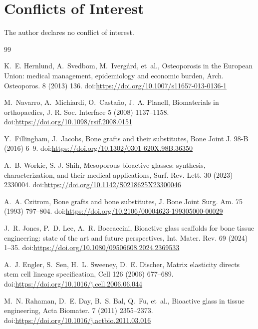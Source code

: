 \documentclass[11pt]{article}
\begin{document}
\section*{Conflicts of Interest}
The author declares no conflict of interest.
\newpage

\begin{thebibliography}{99}


K.~E. Hernlund, A.~Svedbom, M.~Iverg\aa{}rd, et~al., Osteoporosis in the European Union: medical management, epidemiology and economic burden, Arch. Osteoporos. 8 (2013) 136.
\newblock doi:\url{https://doi.org/10.1007/s11657-013-0136-1}


M.~Navarro, A.~Michiardi, O.~Casta\~no, J.~A. Planell, Biomaterials in orthopaedics, J. R. Soc. Interface 5 (2008) 1137--1158.
\newblock doi:\url{https://doi.org/10.1098/rsif.2008.0151}


Y.~Fillingham, J.~Jacobs, Bone grafts and their substitutes, Bone Joint J. 98-B (2016) 6--9.
\newblock doi:\url{https://doi.org/10.1302/0301-620X.98B.36350}

A.~B. Workie, S.-J. Shih, Mesoporous bioactive glasses: synthesis, characterization, and their medical applications, Surf. Rev. Lett. 30 (2023) 2330004.
\newblock doi:\url{https://doi.org/10.1142/S0218625X23300046}

A.~A. Czitrom, Bone grafts and bone substitutes, J. Bone Joint Surg. Am. 75 (1993) 797--804.
\newblock doi:\url{https://doi.org/10.2106/00004623-199305000-00029}


J.~R. Jones, P.~D. Lee, A.~R. Boccaccini, Bioactive glass scaffolds for bone tissue engineering: state of the art and future perspectives, Int. Mater. Rev. 69 (2024) 1--35.
\newblock doi:\url{https://doi.org/10.1080/09506608.2024.2369533}


A.~J. Engler, S.~Sen, H.~L. Sweeney, D.~E. Discher, Matrix elasticity directs stem cell lineage specification, Cell 126 (2006) 677--689.
\newblock doi:\url{https://doi.org/10.1016/j.cell.2006.06.044}


M.~N. Rahaman, D.~E. Day, B.~S. Bal, Q.~Fu, et~al., Bioactive glass in tissue engineering, Acta Biomater. 7 (2011) 2355--2373.
\newblock doi:\url{https://doi.org/10.1016/j.actbio.2011.03.016}



\end{thebibliography}
\end{document}
